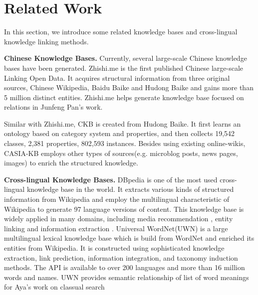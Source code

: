 \documentclass[runningheads,a4paper]{llncs}
\newcommand{\para}[1]{\vspace{0.1cm}\noindent\textbf{#1}}
\begin{document}
\section{Related Work}
\label{sec:work}
In this section, we introduce some related knowledge bases and cross-lingual knowledge linking methods.

\para{Chinese Knowledge Bases.} Currently, several large-scale Chinese knowledge bases have been generated. Zhishi.me\cite{niu2011zhishi,wang2014publishing} is the first published Chinese large-scale Linking Open Data. It acquires structural information from three original sources, Chinese Wikipedia, Baidu Baike and Hudong Baike and gains more than 5 million distinct entities. Zhishi.me helps generate knowledge base focused on relations in Junfeng Pan’s work\cite{pan2012building}.

Similar with Zhishi.me, CKB\cite{wang2012building} is created from Hudong Baike. It first learns an ontology based on category system and properties, and then collects 19,542 classes, 2,381 properties, 802,593 instances. Besides using existing online-wikis, CASIA-KB employs other types of sources(e.g. microblog posts, news pages, images) to enrich the structured knowledge.

\para{Cross-lingual Knowledge Bases.} DBpedia \cite{auer2007dbpedia,mendes2012dbpedia} is one of the most used cross-lingual knowledge base in the world. It extracts various kinds of structured information from Wikipedia and employ the multilingual characteristic of Wikipedia to generate 97 language versions of content. This knowledge base is widely applied in many domains, including media recommendation \cite{fernandez2011generic,kaminskas2012knowledge}, entity linking\cite{mendes2011evaluating} and information extraction \cite{dutta2013integrating}. Universal WordNet(UWN)\cite{de2012uwn} is a large multilingual lexical knowledge base which is build from WordNet and enriched its entities from Wikipedia. It is constructed using sophisticated knowledge extraction, link prediction, information integration, and taxonomy induction methods. The API is available to over 200 languages and more than 16 million words and names. UWN provides semantic relationship of list of word meanings for Aya's work on classual search \cite{al2015conceptual}

\end{document}
